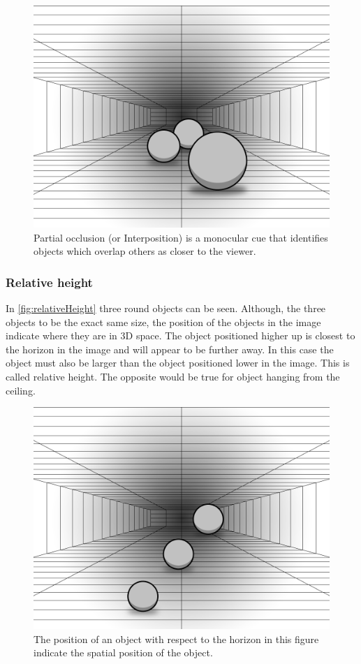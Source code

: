 \begin{figure}[H]
	\centering
	\includegraphics[width=0.8\linewidth]{figure/Analysis/partialOcclusion.png}
	\caption{Partial occlusion (or Interposition) is a monocular cue that identifies objects which overlap others as closer to the viewer.}
	\label{fig:partialOcclusion}
\end{figure}

\subsubsection{Relative height}
In \autoref{fig:relativeHeight} three round objects can be seen. Although, the three objects to be the exact same size, the position of the objects in the image indicate where they are in 3D space. The object positioned higher up is closest to the horizon in the image and will appear to be further away. In this case the object must also be larger than the object positioned lower in the image. This is called relative height. The opposite would be true for object hanging from the ceiling\citep{sensationPerception}.

\begin{figure}[H]
	\centering
	\includegraphics[width=0.8\linewidth]{figure/Analysis/relativeHeight.png}
	\caption{The position of an object with respect to the horizon in this figure indicate the spatial position of the object.}
	\label{fig:relativeHeight}
\end{figure}

